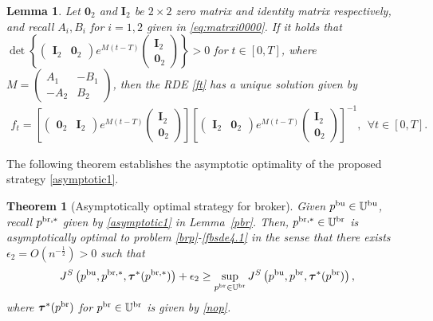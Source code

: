 \documentclass[11pt]{article}
\newtheorem{theorem}{Theorem}[section]
\newtheorem{lemma}{Lemma}[section]
\numberwithin{equation}{section}
\begin{document}
\begin{lemma}\label{condition1}
Let $\boldsymbol{0}_2$ and $\mathbf{I}_2$ be $2 \times 2$ zero matrix and identity matrix respectively, and recall $A_i,B_i$ for $i=1,2$ given in \eqref{eq:matrxi0000}. If it holds that $\det \left\{ \begin{pmatrix} \mathbf{I}_2 &  \boldsymbol{0}_2\end{pmatrix} e^{M(t-T)} \begin{pmatrix}   \mathbf{I}_2\\ \boldsymbol{0}_2 \end{pmatrix} \right\} > 0$ for $t\in[0,T]$, where $M=	\begin{pmatrix}
A_1 & -B_1\\
-A_2 & B_2 
\end{pmatrix}$, then the RDE \eqref{ft} has a unique solution given by
\begin{align}\label{eq:solutionf}
 f_t = \left[ \begin{pmatrix} \boldsymbol{0}_2 & \mathbf{I}_2 \end{pmatrix} e^{M(t-T)} \begin{pmatrix}\mathbf{I}_2\\ \boldsymbol{0}_2  \end{pmatrix} \right] \left[ \begin{pmatrix}   \mathbf{I}_2&\boldsymbol{0}_2 \end{pmatrix} e^{M(t-T)} \begin{pmatrix} \mathbf{I}_2 \\ \boldsymbol{0}_2 \end{pmatrix} \right]^{-1},~~\forall t\in[0,T].   
\end{align}
\end{lemma}
	
The following theorem establishes the asymptotic optimality of the proposed strategy \eqref{asymptotic1}.
\begin{theorem}[Asymptotically optimal strategy for broker]
Given $p^{{\rm bu}}\in\mathbb{U}^{\rm bu}$, recall $p^{{\rm br},*}$ given by \eqref{asymptotic1} in Lemma~\ref{pbr}. Then, $p^{{\rm br},*}\in\mathbb{U}^{\rm br}$ is asymptotically optimal to problem \eqref{brp}-\eqref{fbsde4.1} in the sense that
there exists $\epsilon_2=O(n^{-\frac{1}{2}})>0$ such that 
\begin{align}\label{main1}
J^S\left(p^{{\rm bu}},p^{{\rm br},*}, \boldsymbol{\tau}^*(p^{{\rm br},*})\right)+\epsilon_2\geq \sup_{p^{{\rm br}}\in\mathbb{U}^{\rm br}}J^S\left(p^{{\rm bu}},p^{{\rm br}}, \boldsymbol{\tau}^*(p^{{\rm br}})\right),
\end{align}
where $\boldsymbol{\tau}^*(p^{{\rm br}})$ for $p^{{\rm br}}\in\mathbb{U}^{\rm br}$ is given by \eqref{nop}.
\end{theorem}
\end{document}
